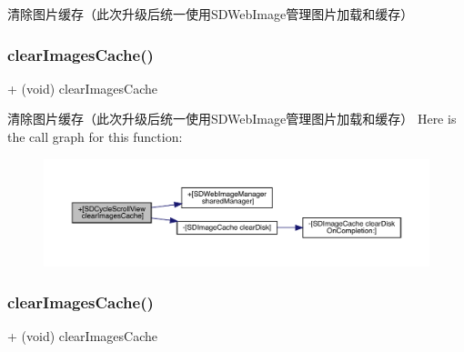 清除图片缓存（此次升级后统一使用\+S\+D\+Web\+Image管理图片加载和缓存） \mbox{\label{interface_s_d_cycle_scroll_view_a85146f335fd4ff38783b358530ad130f}} 
\subsubsection{\texorpdfstring{clear\+Images\+Cache()}{clearImagesCache()}\hspace{0.1cm}{\footnotesize\ttfamily [2/3]}}
{\footnotesize\ttfamily + (void) clear\+Images\+Cache \begin{DoxyParamCaption}{ }\end{DoxyParamCaption}}

清除图片缓存（此次升级后统一使用\+S\+D\+Web\+Image管理图片加载和缓存） Here is the call graph for this function\+:\nopagebreak
\begin{figure}[H]
\begin{center}
\leavevmode
\includegraphics[width=350pt]{interface_s_d_cycle_scroll_view_a85146f335fd4ff38783b358530ad130f_cgraph}
\end{center}
\end{figure}
\mbox{\label{interface_s_d_cycle_scroll_view_a85146f335fd4ff38783b358530ad130f}} 
\subsubsection{\texorpdfstring{clear\+Images\+Cache()}{clearImagesCache()}\hspace{0.1cm}{\footnotesize\ttfamily [3/3]}}
{\footnotesize\ttfamily + (void) clear\+Images\+Cache \begin{DoxyParamCaption}{ }\end{DoxyParamCaption}}

